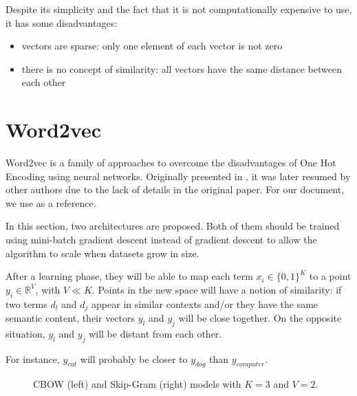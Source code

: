 Despite its simplicity and the fact that it is not computationally expensive to use, it has some disadvantages:
\begin{itemize}
    \item vectors are sparse: only one element of each vector is not zero
    \item there is no concept of similarity: all vectors have the same distance between each other
\end{itemize}

\section{Word2vec}
Word2vec is a family of approaches to overcome the disadvantages of One Hot Encoding using neural networks.
Originally presented in \cite{DBLP:journals/corr/abs-1301-3781}, it was later resumed by other authors due to the lack of details in the original paper.
For our document, we use \cite{DBLP:journals/corr/Rong14} as a reference.


In this section, two architectures are proposed.
Both of them should be trained using mini-batch gradient descent instead of gradient descent to allow the algorithm to scale when datasets grow in size.

After a learning phase, they will be able to map each term $x_i \in \{0, 1\}^K$ to a point $y_i \in \mathbb{R}^V$, with $V \ll K$.
Points in the new space will have a notion of similarity:
if two terms $d_l$ and $d_j$ appear in similar contexts and/or they have the same semantic content,
their vectors $y_l$ and $y_j$ will be close together.
On the opposite situation, $y_l$ and $y_j$ will be distant from each other.

For instance, $y_{cat}$ will probably be closer to $y_{dog}$ than $y_{computer}$.

\begin{figure}[h]
    \centering
    \hfill
    \caption{CBOW (left) and Skip-Gram (right) models with $K=3$ and $V=2$.}
    \label{fig:nnwemb}
\end{figure}

